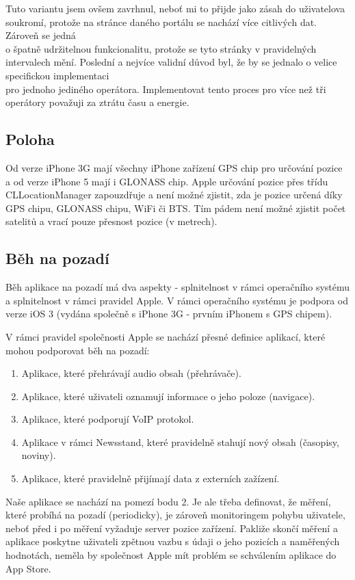 Tuto variantu jsem ovšem zavrhnul, neboť mi to přijde jako zásah do uživatelova soukromí, protože na stránce daného portálu se nachází více citlivých dat. Zároveň se jedná \\o špatně udržitelnou funkcionalitu, protože se tyto stránky v pravidelných intervalech mění. Poslední a nejvíce validní důvod byl, že by se jednalo o velice specifickou implementaci \\pro jednoho jediného operátora. Implementovat tento proces pro více než tři operátory považuji za ztrátu času a energie.
\subsection{Poloha}
Od verze iPhone 3G mají všechny iPhone zařízení GPS chip pro určování pozice a od verze iPhone 5 mají i GLONASS chip. Apple určování pozice přes třídu CLLocationManager zapouzdřuje a není možné zjistit, zda je pozice určená díky GPS chipu, GLONASS chipu, WiFi či BTS. Tím pádem není možné zjistit počet satelitů a vrací pouze přesnost pozice (v metrech).
\subsection{Běh na pozadí}
Běh aplikace na pozadí má dva aspekty - splnitelnost v rámci operačního systému a splnitelnost v rámci pravidel Apple. V rámci operačního systému je podpora od verze iOS 3 (vydána společně s iPhone 3G - prvním iPhonem s GPS chipem). 

V rámci pravidel společnosti Apple se nachází přesné definice aplikací, které mohou podporovat běh na pozadí:

\begin{enumerate}
	\item Aplikace, které přehrávají audio obsah (přehrávače).
	\item Aplikace, které uživateli oznamují informace o jeho poloze (navigace).
	\item Aplikace, které podporují VoIP protokol.
	\item Aplikace v rámci Newsstand, které pravidelně stahují nový obsah (časopisy, noviny).
	\item Aplikace, které pravidelně přijímají data z externích zažízení.
\end{enumerate}

Naše aplikace se nachází na pomezí bodu 2. Je ale třeba definovat, že měření, které probíhá na pozadí (periodicky), je zároveň monitoringem pohybu uživatele, neboť před i po měření vyžaduje server pozice zařízení. Pakliže skončí měření a aplikace poskytne uživateli zpětnou vazbu s údaji o jeho pozicích a naměřených hodnotách, neměla by společnost Apple mít problém se schválením aplikace do App Store.